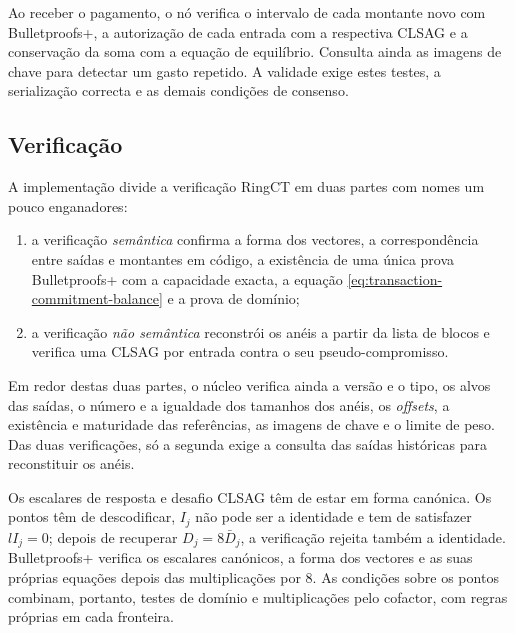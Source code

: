 Ao receber o pagamento, o nó verifica o intervalo de cada montante novo
com Bulletproofs+, a autorização de cada entrada com a respectiva CLSAG
e a conservação da soma com a equação de equilíbrio. Consulta ainda as
imagens de chave para detectar um gasto repetido. A validade exige estes
testes, a serialização correcta e as demais condições de consenso.


\subsection{Verificação}
\label{full-verify}

A implementação divide a verificação RingCT em duas partes com nomes um
pouco enganadores:

\begin{enumerate}
    \item a verificação \emph{semântica} confirma a forma dos vectores, a
    correspondência entre saídas e montantes em código, a existência de uma
    única prova Bulletproofs+ com a capacidade exacta, a equação
    \eqref{eq:transaction-commitment-balance} e a prova de domínio;

    \item a verificação \emph{não semântica} reconstrói os anéis a partir da
    lista de blocos e verifica uma CLSAG por entrada contra o seu
    pseudo-compromisso.
\end{enumerate}

%
Em redor destas duas partes, o núcleo verifica ainda a versão e o tipo, os
alvos das saídas, o número e a igualdade dos tamanhos dos anéis, os
\emph{offsets}, a existência e maturidade das referências, as imagens de
chave e o limite de peso. Das duas verificações, só a segunda exige a
consulta das saídas históricas para reconstituir os anéis.

Os escalares de resposta e desafio CLSAG têm de estar em forma canónica. Os
pontos têm de descodificar, \(I_j\) não pode ser a identidade e tem de
satisfazer \(lI_j=0\); depois de recuperar \(D_j=8\bar D_j\), a verificação
rejeita também a identidade. Bulletproofs+ verifica os escalares canónicos,
a forma dos vectores e as suas próprias equações depois das multiplicações
por 8. As condições sobre os pontos combinam, portanto, testes de domínio
e multiplicações pelo cofactor, com regras próprias em cada fronteira.

